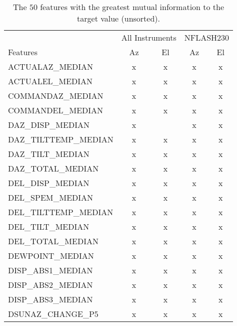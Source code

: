 \begin{table}
    \centering
    \caption{The $50$ features with the greatest mutual information to the target value (unsorted).}
    \begin{tabular}{lcccc}
        \toprule
        & \multicolumn{2}{c}{All Instruments} & \multicolumn{2}{c}{NFLASH230}\\
        \cmidrule(lr){2-3} \cmidrule(lr){4-5}
        Features & Az & El & Az & El \\  \hline
        ACTUALAZ\_MEDIAN       &      x &      x &      x &      x   \\ \hline
        ACTUALEL\_MEDIAN       &      x &      x &      x &      x   \\ \hline
        COMMANDAZ\_MEDIAN       &      x &      x &      x &      x  \\ \hline
        COMMANDEL\_MEDIAN       &      x &      x &      x &      x  \\ \hline
        DAZ\_DISP\_MEDIAN       &      x &        &      x &      x  \\ \hline
        DAZ\_TILTTEMP\_MEDIAN &      x &      x &      x &      x   \\ \hline
        DAZ\_TILT\_MEDIAN      &      x &      x &      x &      x   \\ \hline
        DAZ\_TOTAL\_MEDIAN      &      x &      x &      x &      x  \\ \hline
        DEL\_DISP\_MEDIAN      &      x &      x &      x &      x   \\ \hline
        DEL\_SPEM\_MEDIAN     &      x &      x &      x &      x   \\ \hline
        DEL\_TILTTEMP\_MEDIAN &      x &      x &      x &      x   \\ \hline
        DEL\_TILT\_MEDIAN     &      x &      x &      x &      x   \\ \hline
        DEL\_TOTAL\_MEDIAN    &      x &      x &      x &      x   \\ \hline
        DEWPOINT\_MEDIAN       &      x &      x &      x &      x   \\ \hline
        DISP\_ABS1\_MEDIAN    &      x &      x &      x &      x  \\ \hline
        DISP\_ABS2\_MEDIAN    &      x &      x &      x &      x  \\ \hline
        DISP\_ABS3\_MEDIAN    &      x &      x &      x &      x  \\ \hline
        DSUNAZ\_CHANGE\_P5    &      x &      x &      x &      x  \\ \hline

\end{tabular}
\end{table}
